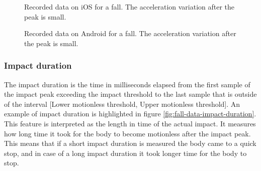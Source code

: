 \documentclass[12pt, a4paper, onecolumn]{article}
\begin{document}
	\begin{figure}[H]
		\centering
		\caption{Recorded data on iOS for a fall. The acceleration variation after the peak is small.}%
		\label{fig:fall-data-fall-ios}%
	\end{figure}
	
	\begin{figure}[H]
		\centering
		\caption{Recorded data on Android for a fall. The acceleration variation after the peak is small.}%
		\label{fig:fall-data-fall-android}%
	\end{figure}
	
	\subsubsection{Impact duration}
	
	The impact duration is the time in milliseconds elapsed from the first sample of the impact peak exceeding the impact threshold to the last sample that is outside of the interval [Lower motionless threshold, Upper motionless threshold]. An example of impact duration is highlighted in figure \ref{fig:fall-data-impact-duration}. This feature is interpreted as the length in time of the actual impact. It measures how long time it took for the body to become motionless after the impact peak. This means that if a short impact duration is measured the body came to a quick stop, and in case of a long impact duration it took longer time for the body to stop.
	
\end{document}
